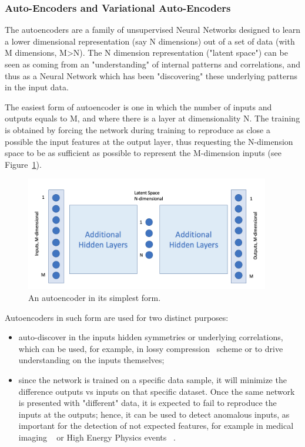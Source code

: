 \subsubsection{Auto-Encoders and Variational Auto-Encoders}
\label{sec:unsupervised}
The autoencoders are a family of unsupervised Neural Networks designed to learn a lower dimensional representation (say N dimensions) out of a set of data (with M dimensions, M\textgreater N). The N dimension representation ("latent space") can be seen as coming from an "understanding" of internal patterns and correlations, and thus as a Neural Network which has been "discovering" these underlying patterns in the input data.

The easiest form of autoencoder is one in which the number of inputs and outputs equals to M, and where there is a layer at dimensionality N. The training is obtained by forcing the network during training to reproduce as close a possible the input features at the output layer, thus requesting the N-dimension space to be as sufficient as possible to represent the M-dimension inputs (see Figure~\ref{fig:autoencoder}).

\begin{figure}[h]
     \centering
     \includegraphics[width=0.95\textwidth]{images/autoencoder.png}
     \caption{An autoencoder in its simplest form.}
     \label{fig:autoencoder}
 \end{figure}
 
 Autoencoders in such form are used for two distinct purposes:
 \begin{itemize}
     \item auto-discover in the inputs hidden symmetries or underlying correlations, which can be used, for example, in lossy compression~\cite{compression} scheme or to drive understanding on the inputs themselves; %
     \item since the network is trained on a specific data sample, it will minimize the difference outputs vs inputs on that specific dataset. Once the same network is presented with "different" data, it is expected to fail to reproduce the inputs at the outputs; hence, it can be used to detect anomalous inputs, as important for the detection of not expected features, for example in medical imaging ~\cite{anomalymed} or High Energy Physics events ~\cite{anomalyhep}. 
 \end{itemize}
 

